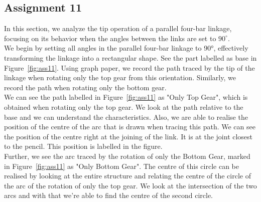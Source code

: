 \documentclass[12pt,a4paper]{report}
\begin{document}
\subsection{\textbf{Assignment 11}}
In this section, we analyze the tip operation of a parallel four-bar linkage, focusing on its behavior when the angles between the links are set to \(90^{\circ}\). \\
We begin by setting all angles in the parallel four-bar linkage to 90°, effectively transforming the linkage into a rectangular
shape. See the part labelled as base in Figure~\ref{fig:ass11}. 
Using graph paper, we record the path traced by the tip of the linkage when rotating only the top gear from this orientation. 
Similarly, we record the path when rotating only the bottom gear. \\
We can see the path labelled in Figure~\ref{fig:ass11} as "Only Top Gear", which is obtained when rotating only the top gear. 
We look at the path relative to the base and we can understand the characteristics. Also, we are able to realise the 
position of the centre of the arc that is drawn when tracing this path. We can see the position of the centre right at the 
joining of the link. It is at the joint closest to the pencil. This position is labelled in the figure. \\
Further, we see the arc traced by the rotation of only the Bottom Gear, marked in Figure~\ref{fig:ass11} as "Only Bottom Gear". 
The centre of this circle can be realised by looking at the entire structure and relating the centre of the circle of the arc of 
the rotation of only the top gear. We look at the intersection of the two arcs and with that we're able to find the centre of 
the second circle. \\
\end{document}

